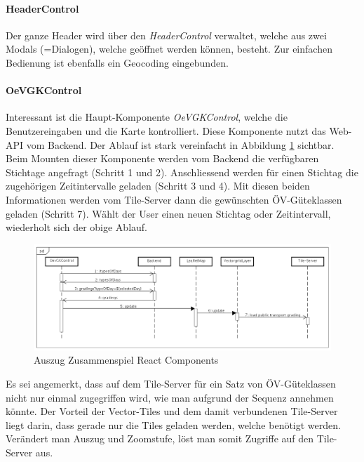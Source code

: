 \paragraph{HeaderControl}
Der ganze Header wird über den \emph{HeaderControl} verwaltet, welche aus zwei Modals (=Dialogen), welche geöffnet werden können, besteht.
Zur einfachen Bedienung ist ebenfalls ein \gls{Geocoding} eingebunden.

\paragraph{OeVGKControl}
Interessant ist die Haupt-Komponente \emph{OeVGKControl}, welche die Benutzereingaben und die Karte kontrolliert.
Diese Komponente nutzt das Web-\acs{API} vom Backend.
Der Ablauf ist stark vereinfacht in Abbildung \ref{fig:Web-App_Sequence} sichtbar.
Beim Mounten dieser Komponente werden vom Backend die verfügbaren Stichtage angefragt (Schritt 1 und 2).
Anschliessend werden für einen Stichtag die zugehörigen Zeitintervalle geladen (Schritt 3 und 4).
Mit diesen beiden Informationen werden vom Tile-Server dann die gewünschten \acs{ÖV}-Güteklassen geladen (Schritt 7).
Wählt der User einen neuen Stichtag oder Zeitintervall, wiederholt sich der obige Ablauf.

\begin{figure}[ht]
    \centering
    \includegraphics[width=1.0\linewidth]{projectdoc/img/Web-App_Sequence.png}
    \caption[Auszug Zusammenspiel React Components]{Auszug Zusammenspiel React Components}
    \label{fig:Web-App_Sequence}
\end{figure}

Es sei angemerkt, dass auf dem Tile-Server für ein Satz von \acs{ÖV}-Güteklassen nicht nur einmal zugegriffen wird, wie man aufgrund der Sequenz annehmen könnte.
Der Vorteil der Vector-Tiles und dem damit verbundenen Tile-Server liegt darin, dass gerade nur die Tiles geladen werden, welche benötigt werden. Verändert man Auszug und Zoomstufe, löst man somit Zugriffe auf den Tile-Server aus.

